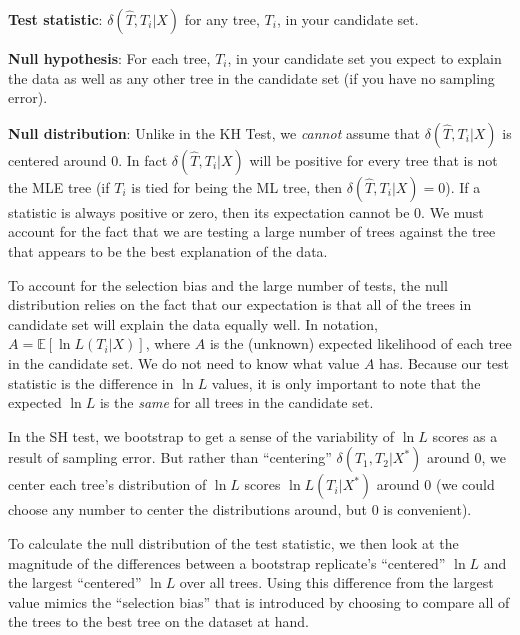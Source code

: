 \documentclass[11pt]{article}
\renewcommand{\subsubsection}[1]{%
\noindent\textbf{#1}:}
\newcommand{\lnL}{\ln L}
\newcommand{\expectation}{{\mathbb{E}}}
\newcommand{\expect}[1]{\expectation\left[#1\right]}
\begin{document}
\subsubsection{Test statistic} $\delta(\hat{T},T_i|X)$ for any tree, $T_i$, in your candidate set.

\subsubsection{Null hypothesis} For each tree, $T_i$, in your candidate set you expect to explain the data as well as any other tree in the candidate set (if you have no sampling error).

\subsubsection{Null distribution} Unlike in the KH Test, we {\em cannot} assume that $\delta(\hat{T},T_i|X)$ is centered around 0.
In fact $\delta(\hat{T},T_i|X)$ will be positive for every tree that is not the MLE tree (if $T_i$ is tied for being the ML tree, then  $\delta(\hat{T},T_i|X) = 0$).
If a statistic is always positive or zero, then its expectation cannot be 0.
We must account for the fact that we are testing a large number of trees against the tree that appears to be the best explanation of  the data.

To account for the selection bias and the large number of tests, the null distribution relies on the fact that our expectation is that all of the trees in candidate set will explain the data equally well.
In notation, $A = \expect{\lnL(T_i|X)}$, where $A$ is the (unknown) expected likelihood of each tree in the candidate set.
We do not need to know what value $A$ has.
Because our test statistic is the difference in $\lnL$ values, it is only important to note that the expected $\lnL$ is the {\em same} for all trees in the candidate set.

In the SH test, we bootstrap to get a sense of the variability of $\lnL$ scores as a result of sampling error.
But rather than ``centering'' $\delta\left(T_1,T_2|X^{\ast}\right)$ around 0,  we center each tree's distribution of $\lnL$ scores $\lnL\left(T_i|X^{\ast}\right)$ around 0 (we could choose any number to center the distributions around, but 0 is convenient).

To calculate the null distribution of the test statistic, we then look at the magnitude of the differences between a bootstrap replicate's ``centered'' $\lnL$ and the largest ``centered'' $\lnL$ over all trees.
Using this difference from the largest value mimics the ``selection bias'' that is introduced by choosing to compare all of the trees to the best tree on the dataset at hand.
\end{document}
